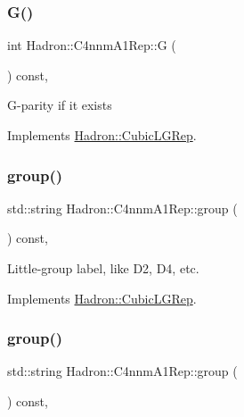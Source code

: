 \subsubsection{\texorpdfstring{G()}{G()}\hspace{0.1cm}{\footnotesize\ttfamily [3/3]}}
{\footnotesize\ttfamily int Hadron\+::\+C4nnm\+A1\+Rep\+::G (\begin{DoxyParamCaption}{ }\end{DoxyParamCaption}) const\hspace{0.3cm}{\ttfamily [inline]}, {\ttfamily [virtual]}}

G-\/parity if it exists 

Implements \mbox{\hyperlink{structHadron_1_1CubicLGRep_ace26f7b2d55e3a668a14cb9026da5231}{Hadron\+::\+Cubic\+L\+G\+Rep}}.

\mbox{\label{structHadron_1_1C4nnmA1Rep_a327b4756034037f9a38a5944d4f98d22}} 
\subsubsection{\texorpdfstring{group()}{group()}\hspace{0.1cm}{\footnotesize\ttfamily [1/5]}}
{\footnotesize\ttfamily std\+::string Hadron\+::\+C4nnm\+A1\+Rep\+::group (\begin{DoxyParamCaption}{ }\end{DoxyParamCaption}) const\hspace{0.3cm}{\ttfamily [inline]}, {\ttfamily [virtual]}}

Little-\/group label, like D2, D4, etc. 

Implements \mbox{\hyperlink{structHadron_1_1CubicLGRep_a9bdb14b519a611d21379ed96a3a9eb41}{Hadron\+::\+Cubic\+L\+G\+Rep}}.

\mbox{\label{structHadron_1_1C4nnmA1Rep_a327b4756034037f9a38a5944d4f98d22}} 
\subsubsection{\texorpdfstring{group()}{group()}\hspace{0.1cm}{\footnotesize\ttfamily [2/5]}}
{\footnotesize\ttfamily std\+::string Hadron\+::\+C4nnm\+A1\+Rep\+::group (\begin{DoxyParamCaption}{ }\end{DoxyParamCaption}) const\hspace{0.3cm}{\ttfamily [inline]}, {\ttfamily [virtual]}}

